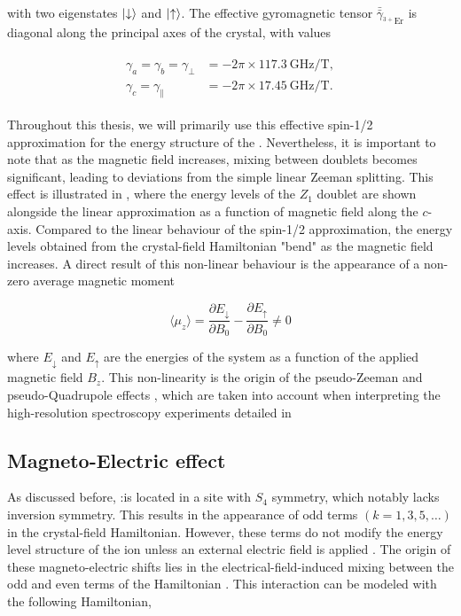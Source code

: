 with two eigenstates $\ket{\downarrow}$ and $\ket{\uparrow}$. The effective gyromagnetic tensor $\bar{\bar{\gamma}}_{^{3+}\text{Er}}$ is diagonal along the principal axes of the crystal, with values 

\begin{align}
\begin{split}
    \gamma_a = \gamma_b = \gamma_\perp &= -2\pi \times 117.3~\text{GHz/T}, \\
    \gamma_c = \gamma_\parallel &= -2\pi \times 17.45~\text{GHz/T}.
\end{split}
\end{align}

Throughout this thesis, we will primarily use this effective spin-1/2 approximation for the energy structure of the \Er. Nevertheless, it is important to note that as the magnetic field increases, mixing between doublets becomes significant, leading to deviations from the simple linear Zeeman splitting. This effect is illustrated in , where the energy levels of the $Z_1$ doublet are shown alongside the linear approximation as a function of magnetic field along the $c$-axis. Compared to the linear behaviour of the spin-1/2 approximation, the energy levels obtained from the crystal-field Hamiltonian "bend" as the magnetic field increases. A direct result of this non-linear behaviour is the appearance of a non-zero average magnetic moment

\begin{equation}
    \langle \mu_z \rangle = \frac{\partial E_\downarrow}{\partial B_0} - \frac{\partial E_\uparrow}{\partial B_0} \neq 0
\end{equation}

where $E_\downarrow$ and $E_\uparrow$ are the energies of the system as a function of the applied magnetic field $B_z$. This non-linearity is the origin of the pseudo-Zeeman  and pseudo-Quadrupole effects , which are taken into account when interpreting the high-resolution spectroscopy experiments detailed in 

\subsection{Magneto-Electric effect}
\label{sec:magneto-optic}

As discussed before, \Er:\Ca is located in a site with $S_4$ symmetry, which notably lacks inversion symmetry. This results in the appearance of odd terms $(k=1,3,5,\dots)$ in the crystal-field Hamiltonian. However, these terms do not modify the energy level structure of the ion unless an external electric field is applied . The origin of these magneto-electric shifts lies in the electrical-field-induced mixing between the odd and even terms of the Hamiltonian . This interaction can be modeled with the following Hamiltonian,

